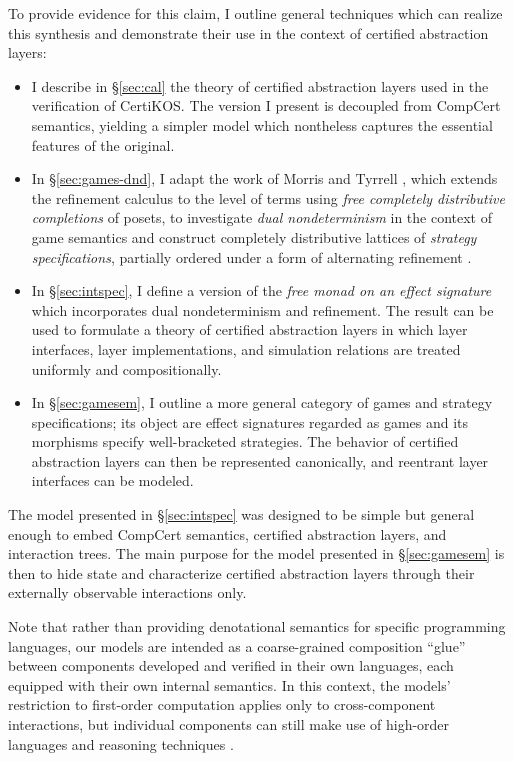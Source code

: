 \documentclass[draft,11pt]{report}
\theoremstyle{definition}
\begin{document}
To provide evidence for this claim,
I outline general techniques
which can realize this synthesis
and demonstrate their use
in the context of certified abstraction layers:
\begin{itemize}
\item
  I describe in \S\ref{sec:cal}
  the theory of certified abstraction layers
  used in the verification of CertiKOS.
  The version I present is decoupled from
  CompCert semantics,
  yielding a simpler model
  which nontheless captures
  the essential features of the original.
\item
  In \S\ref{sec:games-dnd},
  I adapt the work of Morris and Tyrrell \citep{augtyp,dndf},
  which extends the refinement calculus to the level of terms
  using \emph{free completely distributive completions} of posets,
  to investigate \emph{dual nondeterminism}
  in the context of game semantics
  and construct
  completely distributive lattices of
  \emph{strategy specifications},
  partially ordered
  under a form of alternating refinement
  \citep{altref}.
\item
  In \S\ref{sec:intspec},
  I define a version of the
  \emph{free monad on an effect signature}
  which incorporates dual nondeterminism and refinement.
  The result can be used to formulate a theory of certified abstraction
  layers in which
  layer interfaces, layer implementations, and simulation relations
  are treated uniformly and compositionally.
\item
  In \S\ref{sec:gamesem},
  I outline a more general category of games and
  strategy specifications;
  its object are effect signatures regarded as games
  and its morphisms specify well-bracketed strategies.
  The behavior of certified abstraction layers
  can then be represented canonically,
  and reentrant layer interfaces can be modeled.
\end{itemize}

The model presented in \S\ref{sec:intspec} was designed to be simple but
general enough to embed CompCert semantics, certified
abstraction layers, and interaction trees. The main purpose for
the model presented in \S\ref{sec:gamesem} is then to hide state and
characterize certified abstraction layers through
their externally observable interactions only.

Note that rather than providing
denotational semantics for specific programming
languages, our models are intended as a coarse-grained composition
``glue'' between components developed and verified in their own
languages, each equipped with their own internal semantics.
In this context,
the models' restriction to first-order computation
applies only to cross-component interactions,
but individual components can still make use of
high-order languages and reasoning techniques
\citep{hosl-fo}.
\end{document}
